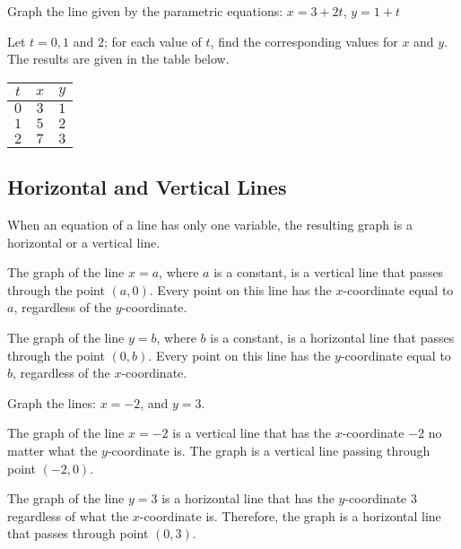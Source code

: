 \begin{example}
Graph the line given by the parametric equations: $x = 3 + 2t$, $y = 1 + t$
\end{example}

\begin{solution} Let $t = 0, 1$ and $2$; for each value of $t$, find the corresponding values for $x$ and $y$. The results are given in the table below.

\begin{center}
\begin{tabular}{c|c|c}
    $t$ & $x$ & $y$ \\
    \hline
    $0$ & $3$ & $1$ \\
    $1$ & $5$ & $2$ \\
    $2$ & $7$ & $3$ \\
\end{tabular}
\end{center}

\end{solution}
\subsection{Horizontal and Vertical Lines}

When an equation of a line has only one variable, the resulting graph is a horizontal or a vertical line.

The graph of the line \(x = a\), where \(a\) is a constant, is a vertical line that passes through the point \((a, 0)\). Every point on this line has the \(x\)-coordinate equal to \(a\), regardless of the \(y\)-coordinate.

The graph of the line \(y = b\), where \(b\) is a constant, is a horizontal line that passes through the point \((0, b)\). Every point on this line has the \(y\)-coordinate equal to \(b\), regardless of the \(x\)-coordinate.

\begin{example}
Graph the lines: \(x = -2\), and \(y = 3\).
\end{example}

\begin{solution} The graph of the line \(x = -2\) is a vertical line that has the \(x\)-coordinate \(-2\) no matter what the \(y\)-coordinate is. The graph is a vertical line passing through point \((-2, 0)\).

The graph of the line \(y = 3\) is a horizontal line that has the \(y\)-coordinate \(3\) regardless of what the \(x\)-coordinate is. Therefore, the graph is a horizontal line that passes through point \((0, 3)\).

\end{solution}


